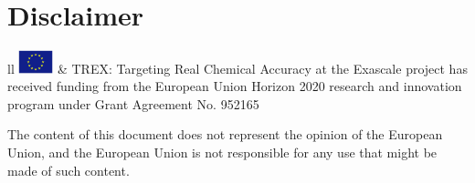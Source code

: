 \section*{Disclaimer}
\begin{table}{ll}
\includegraphics[width=1cm]{images/EU_flag.png} &
TREX: Targeting Real Chemical Accuracy at the Exascale project has received
funding from the European Union Horizon 2020 research and innovation program
under Grant Agreement No. 952165
\end{table}
The content of this document does not represent the opinion of the European
Union, and the European Union is not responsible for any use that might be made
of such content.


\clearpage

